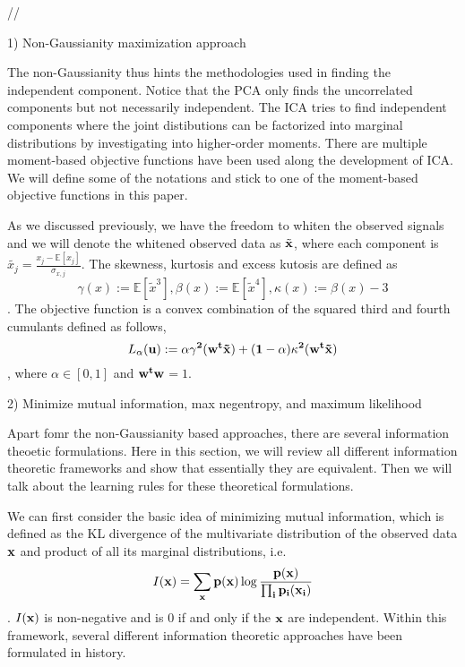 \documentclass[aps,prl,preprint,superscriptaddress]{revtex4-2}
\begin{document}
//

1) Non-Gaussianity maximization approach

The non-Gaussianity thus hints the methodologies used in finding the independent component. Notice that the PCA only finds the uncorrelated components but not necessarily independent. The ICA tries to find independent components where the joint distibutions can be factorized into marginal distributions by investigating into higher-order moments. There are multiple moment-based objective functions have been used along the development of ICA. We will define some of the notations and stick to one of the moment-based objective functions in this paper.  

As we discussed previously, we have the freedom to whiten the observed signals and we will denote the whitened observed data as $\tilde{\bf{x}}$, where each component is $\tilde{x_{j}} = \frac{x_{j}-\mathbb{E}[x_{j}]}{\sigma_{x,j}}$. The skewness, kurtosis and excess kutosis are defined as $$ \gamma(x) := \mathbb{E}[\tilde{x}^{3}], \beta(x) := \mathbb{E}[\tilde{x}^{4}], \kappa(x) := \beta(x)-3 $$.
The objective function is a convex combination of the squared third and fourth cumulants defined as follows,
\begin{equation}
L_{\alpha}(\bf{u}) := \alpha \gamma^{2}(\bf{w}^{t}\tilde{\bf{x}}) + (1-\alpha)\kappa^{2}(\bf{w}^{t}\tilde{\bf{x}})
\end{equation},
where $\alpha \in [0, 1]$ and $\bf{w}^{t}\bf{w}$$ = 1$.


2) Minimize mutual information, max negentropy, and maximum likelihood

Apart fomr the non-Gaussianity based approaches, there are several information theoetic formulations. Here in this section, we will review all different information theoretic frameworks and show that essentially they are equivalent. Then we will talk about the learning rules for these theoretical formulations. 

We can first consider the basic idea of minimizing mutual information, which is defined as the KL divergence of the multivariate distribution of the observed data $\bf{x}$ and product of all its marginal distributions, i.e. 
\begin{equation}
I(\bf{x}) = \sum_{\bf{x}}p(\bf{x})\log\frac{p(\bf{x})}{\prod_{i}p_{i}(x_{i})}
\end{equation}. $I(\bf{x})$ is non-negative and is 0 if and only if the $\bf{x}$ are independent. Within this framework, several different information theoretic approaches have been formulated in history. 
\end{document}
